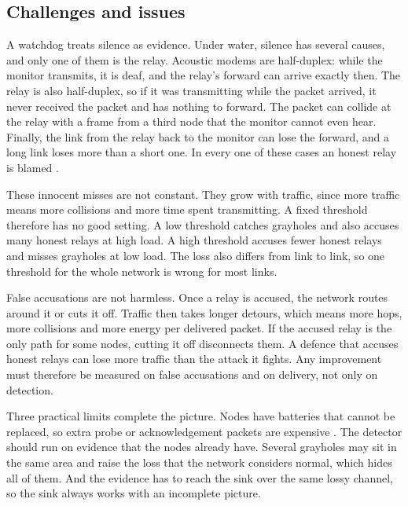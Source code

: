 \documentclass{article}
\begin{document}
\subsection{Challenges and issues}\label{sec:challenges}
\noindent
A watchdog treats silence as evidence. Under water, silence has several causes, and only one of them is the relay. Acoustic modems are half-duplex: while the monitor transmits, it is deaf, and the relay's forward can arrive exactly then. The relay is also half-duplex, so if it was transmitting while the packet arrived, it never received the packet and has nothing to forward. The packet can collide at the relay with a frame from a third node that the monitor cannot even hear. Finally, the link from the relay back to the monitor can lose the forward, and a long link loses more than a short one. In every one of these cases an honest relay is blamed \cite{marti2000}.

These innocent misses are not constant. They grow with traffic, since more traffic means more collisions and more time spent transmitting. A fixed threshold therefore has no good setting. A low threshold catches grayholes and also accuses many honest relays at high load. A high threshold accuses fewer honest relays and misses grayholes at low load. The loss also differs from link to link, so one threshold for the whole network is wrong for most links.

False accusations are not harmless. Once a relay is accused, the network routes around it or cuts it off. Traffic then takes longer detours, which means more hops, more collisions and more energy per delivered packet. If the accused relay is the only path for some nodes, cutting it off disconnects them. A defence that accuses honest relays can lose more traffic than the attack it fights. Any improvement must therefore be measured on false accusations and on delivery, not only on detection.

Three practical limits complete the picture. Nodes have batteries that cannot be replaced, so extra probe or acknowledgement packets are expensive \cite{akyildiz2005}. The detector should run on evidence that the nodes already have. Several grayholes may sit in the same area and raise the loss that the network considers normal, which hides all of them. And the evidence has to reach the sink over the same lossy channel, so the sink always works with an incomplete picture.
\end{document}
